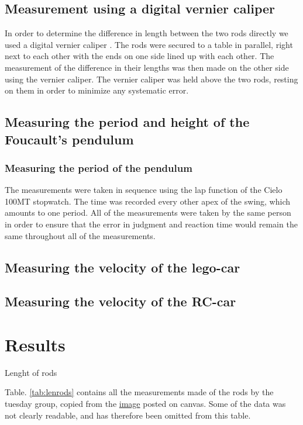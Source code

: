 \documentclass[11pt,a4paper]{article}
\begin{document}
    \subsection{Measurement using a digital vernier caliper}
      In order to determine the difference in length between the two rods directly we used a digital vernier caliper \cite{cocraft}. The rods were secured to a table in parallel, right next to each other with the ends on one side lined up with each other. The measurement of the difference in their lengths was then made on the other side using the vernier caliper. The vernier caliper was held above the two rods, resting on them in order to minimize any systematic error.

  \subsection{Measuring the period and height of the Foucault's pendulum}
    \subsubsection{Measuring the period of the pendulum}
    The measurements were taken in sequence using the lap function of the Cielo 100MT \cite{cielo} stopwatch. The time was recorded every other apex of the swing, which amounts to one period. All of the measurements were taken by the same person in order to ensure that the error in judgment and reaction time would remain the same throughout all of the measurements.

  \subsection{Measuring the velocity of the lego-car}
  
  
  \subsection{Measuring the velocity of the RC-car}

\section{\label{sec:data} Results}
  \begin{table}[H]
    \center
    \caption{Lenght of rods}
    \label{tab:lenrods}
    
  \end{table}

  Table. \ref{tab:lenrods} contains all the measurements made of the rods by the tuesday group, copied from the \href{https://uio.instructure.com/courses/910/modules/items/13592}{image} posted on canvas. Some of the data was not clearly readable, and has therefore been omitted from this table.
\end{document}
